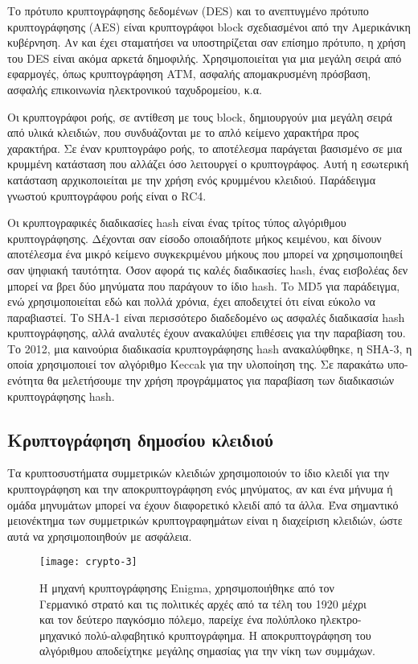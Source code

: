 Το πρότυπο κρυπτογράφησης δεδομένων (DES) και το ανεπτυγμένο πρότυπο κρυπτογράφησης (AES) είναι κρυπτογράφοι block σχεδιασμένοι από την Αμερικάνικη κυβέρνηση. Αν και έχει σταματήσει να υποστηρίζεται σαν επίσημο πρότυπο, η χρήση του DES είναι ακόμα αρκετά δημοφιλής. Χρησιμοποιείται για μια μεγάλη σειρά από εφαρμογές, όπως κρυπτογράφηση ATM, ασφαλής απομακρυσμένη πρόσβαση, ασφαλής επικοινωνία ηλεκτρονικού ταχυδρομείου, κ.α.

Οι κρυπτογράφοι ροής, σε αντίθεση με τους block, δημιουργούν μια μεγάλη σειρά από υλικά κλειδιών, που συνδυάζονται με το απλό κείμενο χαρακτήρα προς χαρακτήρα. Σε έναν κρυπτογράφο ροής, το αποτέλεσμα παράγεται βασισμένο σε μια κρυμμένη κατάσταση που αλλάζει όσο λειτουργεί ο κρυπτογράφος. Αυτή η εσωτερική κατάσταση αρχικοποιείται με την χρήση ενός κρυμμένου κλειδιού. Παράδειγμα γνωστού κρυπτογράφου ροής είναι ο RC4.\cite{cryptography-3}

Οι κρυπτογραφικές διαδικασίες hash είναι ένας τρίτος τύπος αλγόριθμου κρυπτογράφησης. Δέχονται σαν είσοδο οποιαδήποτε μήκος κειμένου, και δίνουν αποτέλεσμα ένα μικρό κείμενο συγκεκριμένου μήκους που μπορεί να χρησιμοποιηθεί σαν ψηφιακή ταυτότητα. Όσον αφορά τις καλές διαδικασίες hash, ένας εισβολέας δεν μπορεί να βρει δύο μηνύματα που παράγουν το ίδιο hash. \cite{cryptography-4}To MD5 για παράδειγμα, ενώ χρησιμοποιείται εδώ και πολλά χρόνια, έχει αποδειχτεί ότι είναι εύκολο να παραβιαστεί. Το SHA-1 είναι περισσότερο διαδεδομένο ως ασφαλές διαδικασία hash κρυπτογράφησης, αλλά αναλυτές έχουν ανακαλύψει επιθέσεις για την παραβίαση του. Το 2012, μια καινούρια διαδικασία κρυπτογράφησης hash ανακαλύφθηκε, η SHA-3, η οποία χρησιμοποιεί τον αλγόριθμο Keccak για την υλοποίηση της. Σε παρακάτω υπο-ενότητα θα μελετήσουμε την χρήση προγράμματος για παραβίαση των διαδικασιών κρυπτογράφησης hash.\cite{cryptography-5}
\subsection{Κρυπτογράφηση δημοσίου κλειδιού}
Τα κρυπτοσυστήματα συμμετρικών κλειδιών χρησιμοποιούν το ίδιο κλειδί για την κρυπτογράφηση και την αποκρυπτογράφηση ενός μηνύματος, αν και ένα μήνυμα ή ομάδα μηνυμάτων μπορεί να έχουν διαφορετικό κλειδί από τα άλλα. Ένα σημαντικό μειονέκτημα των συμμετρικών κρυπτογραφημάτων είναι η διαχείριση κλειδιών, ώστε αυτά να χρησιμοποιηθούν με ασφάλεια. 

\begin{figure}[h]
\centering
\texttt{[image: crypto-3]}
\caption{Η μηχανή κρυπτογράφησης Enigma, χρησιμοποιήθηκε από τον Γερμανικό στρατό και τις πολιτικές αρχές από τα τέλη του 1920 μέχρι και τον δεύτερο παγκόσμιο πόλεμο, παρείχε ένα πολύπλοκο ηλεκτρο-μηχανικό πολύ-αλφαβητικό κρυπτογράφημα. H αποκρυπτογράφηση του αλγόριθμου αποδείχτηκε μεγάλης σημασίας για την νίκη των συμμάχων.}
\end{figure}

